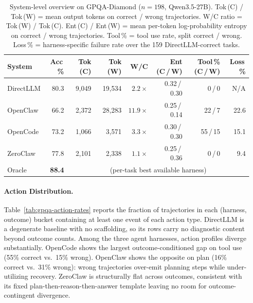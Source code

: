 \begin{table}[t]
\centering
\small
\caption{%
  System-level overview on GPQA-Diamond ($n=198$, Qwen3.5-27B).
  Tok\,(C) / Tok\,(W) = mean output tokens on correct / wrong trajectories.
  W/C ratio = Tok\,(W) / Tok\,(C).
  Ent\,(C) / Ent\,(W) = mean per-token log-probability entropy on correct / wrong
  trajectories.
  Tool\,\% = tool use rate, split correct / wrong.
  Loss\,\% = harness-specific failure rate over the 159 DirectLLM-correct tasks.
}
\label{tab:gpqa-overview}
\setlength{\tabcolsep}{3pt}
\begin{tabular}{lrrrrrrr}
\toprule
System & Acc\,\% & Tok (C) & Tok (W) & W/C & Ent (C\,/\,W) & Tool\,\% (C\,/\,W) & Loss\,\% \\
\midrule
DirectLLM &  80.3 &  9{,}049 & 19{,}534 & $2.2{\times}$  & 0.32\,/\,0.30 & 0\,/\,0    & N/A  \\
OpenClaw  &  66.2 &  2{,}372 & 28{,}283 & $11.9{\times}$ & 0.25\,/\,0.14 & 22\,/\,7   & 22.6 \\
OpenCode  &  73.2 &  1{,}066 &  3{,}571 & $3.3{\times}$  & 0.30\,/\,0.30 & 55\,/\,15  & 15.1 \\
ZeroClaw  &  77.8 &  2{,}101 &  2{,}338 & $1.1{\times}$  & 0.25\,/\,0.36 & 0\,/\,0    &  9.4 \\
\midrule
Oracle    &  \textbf{88.4} & \multicolumn{6}{c}{(per-task best available harness)} \\
\bottomrule
\end{tabular}
\end{table}

\paragraph{Action Distribution.}
Table~\ref{tab:gpqa-action-rates} reports the fraction of trajectories in each
(harness, outcome) bucket containing at least one event of each action type.
DirectLLM is a degenerate baseline with no scaffolding, so its rows carry no
diagnostic content beyond outcome counts.
Among the three agent harnesses, action profiles diverge substantially.
OpenCode shows the largest outcome-conditioned gap on tool use (55\% correct
vs.\ 15\% wrong).
OpenClaw shows the opposite on plan (16\% correct vs.\ 31\% wrong): wrong
trajectories over-emit planning steps while under-utilizing recovery.
ZeroClaw is structurally flat across outcomes, consistent with its fixed
plan-then-reason-then-answer template leaving no room for outcome-contingent
divergence.

